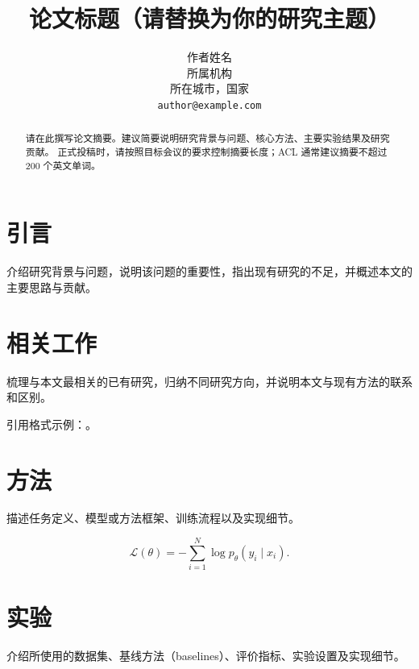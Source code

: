 \documentclass[11pt]{article}
\title{论文标题（请替换为你的研究主题）}
\author{
  作者姓名 \\
  所属机构 \\
  所在城市，国家 \\
  \texttt{author@example.com}
}
\begin{document}
\maketitle

\begin{abstract}
请在此撰写论文摘要。建议简要说明研究背景与问题、核心方法、主要实验结果及研究贡献。
正式投稿时，请按照目标会议的要求控制摘要长度；ACL 通常建议摘要不超过 200 个英文单词。
\end{abstract}

\section{引言}

介绍研究背景与问题，说明该问题的重要性，指出现有研究的不足，并概述本文的主要思路与贡献。


\section{相关工作}

梳理与本文最相关的已有研究，归纳不同研究方向，并说明本文与现有方法的联系和区别。

引用格式示例：\citet{Gusfield:97}。

\section{方法}

描述任务定义、模型或方法框架、训练流程以及实现细节。

\begin{equation}
  \mathcal{L}(\theta)
  = -\sum_{i=1}^{N}\log p_{\theta}(y_i \mid x_i).
\end{equation}

\section{实验}

介绍所使用的数据集、基线方法（baselines）、评价指标、实验设置及实现细节。

\end{document}

